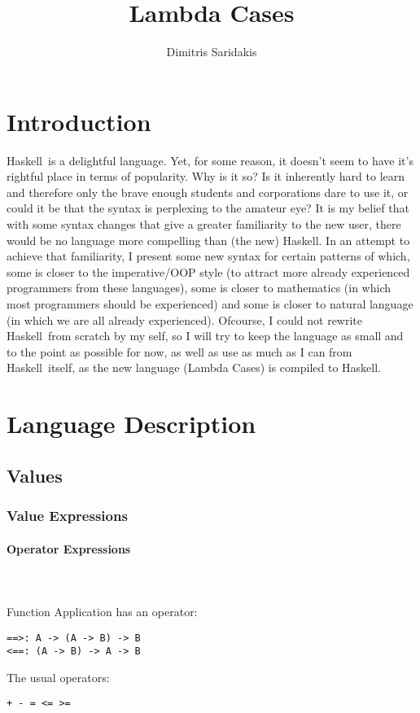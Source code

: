 \documentclass{article}
\date{}
\author{
  Dimitris Saridakis
}
\def\H{Haskell}
\begin{document}
\title{
\textbf{Lambda Cases}
}
\maketitle

\section{Introduction}

\H\ is a delightful language. Yet, for some reason, it doesn't seem to have it's 
rightful place in terms of popularity. Why is it so? Is it inherently hard to learn
and therefore only the brave enough students and corporations dare to use it, or
could it be that the syntax is perplexing to the amateur eye? It is my belief that 
with some syntax changes that give a greater familiarity to the new user, there
would be no language more compelling than (the new) \H. In an attempt to achieve
that familiarity, I present some new syntax for certain patterns of which,
some is closer to the imperative/OOP style (to attract more already experienced
programmers from these languages), some is closer to mathematics (in which most 
programmers should be experienced) and some is closer to natural language
(in which we are all already experienced). Ofcourse, I could not rewrite \H\
from scratch by my self, so I will try to keep the language as small and to the 
point as possible for now, as well as use as much as I can from \H\ itself, as 
the new language (Lambda Cases) is compiled to \H.

\section{Language Description}

\subsection{Values}

\subsubsection{Value Expressions}

\paragraph{Operator Expressions}\mbox{} \\\\
Function Application has an operator: 
\begin{verbatim}
==>: A -> (A -> B) -> B
<==: (A -> B) -> A -> B
\end{verbatim}
The usual operators:
\begin{verbatim}
+ - = <= >= 
\end{verbatim}
\end{document}
